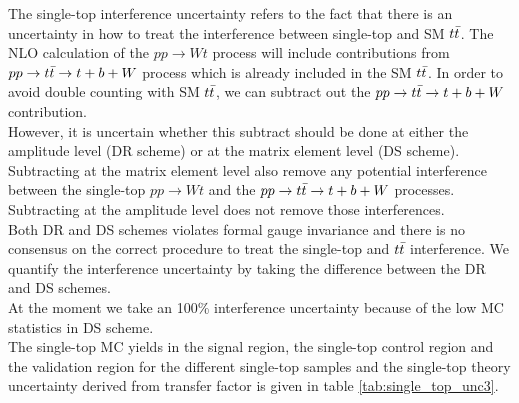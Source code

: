 \indent The single-top interference uncertainty refers to the fact that there is an uncertainty in how to treat the interference between single-top and SM $t\bar{t}$.  The NLO calculation of the $pp \rightarrow Wt$ process will include contributions from $ pp \rightarrow t\bar{t} \rightarrow t + b + W$ process which is already included in the SM $t\bar{t}$.  In order to avoid double counting with SM $t\bar{t}$, we can subtract out the $pp \rightarrow t\bar{t} \rightarrow t + b + W$ contribution.  \\

\indent However, it is uncertain whether this subtract should be done at either the amplitude level (DR scheme) or at the matrix element level (DS scheme).  Subtracting at the matrix element level also remove any potential interference between the single-top $pp \rightarrow Wt$ and the $ pp \rightarrow t\bar{t} \rightarrow t + b + W$ processes.  Subtracting at the amplitude level does not remove those interferences. \\

\indent  Both DR and DS schemes violates formal gauge invariance and there is no consensus on the correct procedure to treat the single-top and  $t\bar{t}$ interference.  We quantify the interference uncertainty by taking the difference between the DR and DS schemes.  \\

\indent At the moment we take an 100\% interference uncertainty because of the low MC statistics in DS scheme. \\

\indent The single-top MC yields in the signal region, the single-top control region and the validation region for the different single-top samples and the single-top theory uncertainty derived from transfer factor is given in table \ref{tab:single_top_unc3}. \\

